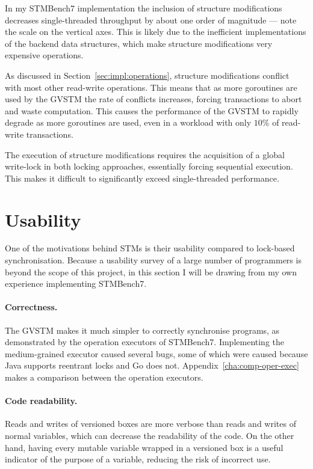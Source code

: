 \documentclass[12pt,a4paper,oneside,openright]{report}
\begin{document}
In my STMBench7 implementation the inclusion of structure
modifications decreases single-threaded throughput by about one order
of magnitude --- note the scale on the vertical axes. This is likely
due to the inefficient implementations of the backend data structures,
which make structure modifications very expensive operations.

As discussed in Section~\ref{sec:impl:operations}, structure
modifications conflict with most other read-write operations. This
means that as more goroutines are used by the GVSTM the rate of
conflicts increases, forcing transactions to abort and waste
computation. This causes the performance of the GVSTM to rapidly
degrade as more goroutines are used, even in a workload with only
$10\%$ of read-write transactions.

The execution of structure modifications requires the acquisition of a
global write-lock in both locking approaches, essentially forcing
sequential execution. This makes it difficult to significantly exceed
single-threaded performance.

\section{Usability}
\label{sec:eval:ease-use}

One of the motivations behind STMs is their usability compared to
lock-based synchronisation. Because a usability survey of a large
number of programmers is beyond the scope of this project, in this
section I will be drawing from my own experience implementing
STMBench7.

\paragraph{Correctness.} The GVSTM makes it much simpler to correctly
synchronise programs, as demonstrated by the operation executors of
STMBench7. Implementing the medium-grained executor caused several
bugs, some of which were caused because Java supports reentrant locks
and Go does not. Appendix~\ref{cha:comp-oper-exec} makes a comparison
between the operation executors.

\paragraph{Code readability.} Reads and writes of versioned boxes are
more verbose than reads and writes of normal variables, which can
decrease the readability of the code. On the other hand, having every
mutable variable wrapped in a versioned box is a useful indicator of
the purpose of a variable, reducing the risk of incorrect use.
\end{document}
